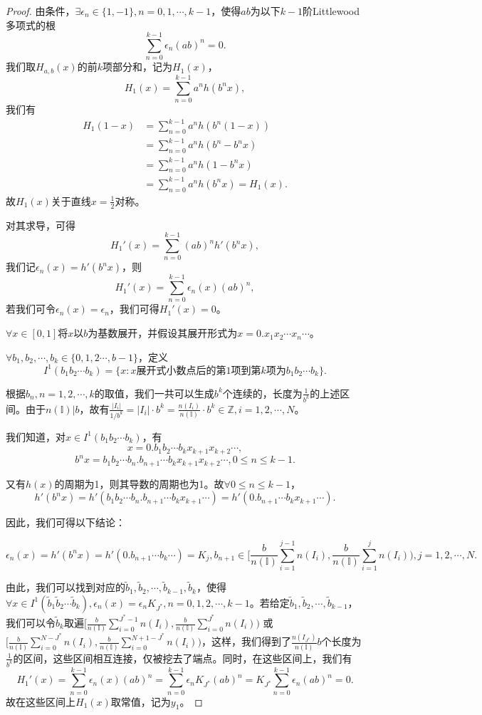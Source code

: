 \begin{proof}
由条件，$\exists \epsilon_n\in\{1,-1\},n=0,1,\cdots,k-1$，使得$ab$为以下$k-1$阶Littlewood多项式的根
$$
      \sum_{n=0}^{k-1}\epsilon_n(ab)^n=0.
$$
我们取$H_{a,b}(x)$的前$k$项部分和，记为$H_1(x)$，
$$
      H_1(x)=\sum_{n=0}^{k-1}a^nh(b^nx),
$$
我们有
$$
    \begin{aligned}
        H_1(1-x)&=\sum_{n=0}^{k-1}a^nh(b^n(1-x))\\
                &=\sum_{n=0}^{k-1}a^nh(b^n-b^nx)\\
                &=\sum_{n=0}^{k-1}a^nh(1-b^nx)\\
                &=\sum_{n=0}^{k-1}a^nh(b^nx)=H_1(x).
    \end{aligned}
$$
故$H_1(x)$关于直线$x=\frac{1}{2}$对称。

对其求导，可得
$$
      H_1'(x)=\sum_{n=0}^{k-1}(ab)^nh'(b^nx),
$$
我们记$\epsilon_n(x)=h'(b^nx)$，则
$$
      H_1'(x)=\sum_{n=0}^{k-1}\epsilon_n(x)(ab)^n,
$$
若我们可令$\epsilon_n(x)=\epsilon_n$，我们可得$H_1'(x)=0$。

$\forall x\in[0,1]$将$x$以$b$为基数展开，并假设其展开形式为$x=0.x_1x_2\cdots x_n\cdots$。

$\forall b_1,b_2,\cdots,b_k\in\{0,1,2\cdots,b-1\}$，定义
$$
      I^1(b_1b_2\cdots b_k)=\{x:x\mbox{展开式小数点后的第}1\mbox{项到第}k\mbox{项为}b_1b_2\cdots b_k\}.
$$

根据$b_n,n=1,2,\cdots,k$的取值，我们一共可以生成$b^k$个连续的，长度为$\frac{1}{b^k}$的上述区间。由于$n(\mathbb{I})|b$，故有$\frac{|I_i|}{1/b^k}=|I_i|\cdot b^k=\frac{n(I_i)}{n(\mathbb{I})}\cdot b^k\in\mathbb{Z},i=1,2,\cdots,N$。

我们知道，对$x\in I^1(b_1b_2\cdots b_k)$，有
$$
      x=0.b_1b_2\cdots b_kx_{k+1}x_{k+2}\cdots,
$$
$$
b^{n}x=b_1b_2\cdots b_{n}.b_{n+1}\cdots b_kx_{k+1}x_{k+2}\cdots,0\le n\le k-1.
$$

又有$h(x)$的周期为1，则其导数的周期也为1。故$\forall0\le n\le k-1$，
$$
      h'(b^nx)=h'(b_1b_2\cdots b_n.b_{n+1}\cdots b_kx_{k+1}\cdots)=h'(0.b_{n+1}\cdots b_kx_{k+1}\cdots).
$$

因此，我们可得以下结论：

$$
      \epsilon_n(x)=h'(b^nx)=h'(0.b_{n+1}\cdots b_k\cdots)=            K_j,b_{n+1}\in{[}\frac{b}{n(\mathbb{I})}\sum_{i=1}^{j-1}n(I_i),\frac{b}{n(\mathbb{I})}\sum_{i=1}^{j}n(I_i){)},j=1,2,\cdots,N.
$$

由此，我们可以找到对应的$\tilde{b}_1,\tilde{b}_2,\cdots,\tilde{b}_{k-1},\tilde{b}_k$，使得$\forall x\in I^1(\tilde{b}_1\tilde{b}_2\cdots \tilde{b}_k),\epsilon_n(x)=\epsilon_nK_{J^*},n=0,1,2,\cdots,k-1$。若给定$\tilde{b}_1,\tilde{b}_2,\cdots,\tilde{b}_{k-1}$，我们可以令$\tilde{b}_k$取遍${[}\frac{b}{n(\mathbb{I})}\sum_{i=0}^{J^*-1}n(I_i),\frac{b}{n(\mathbb{I})}\sum_{i=0}^{J^*}n(I_i){)}$
或${[}\frac{b}{n(\mathbb{I})}\sum_{i=0}^{N-J^*}n(I_i),\frac{b}{n(\mathbb{I})}\sum_{i=0}^{N+1-J^*}n(I_i){)}$，这样，我们得到了$\frac{n(I_{J^*})}{n(\mathbb{I})}b$个长度为$\frac{1}{b^k}$的区间，这些区间相互连接，仅被挖去了端点。同时，在这些区间上，我们有
$$
      H_1'(x)=\sum_{n=0}^{k-1}\epsilon_n(x)(ab)^n=\sum_{n=0}^{k-1}\epsilon_nK_{J^*}(ab)^n=K_{J^*}\sum_{n=0}^{k-1}\epsilon_n(ab)^n=0.
$$
故在这些区间上$H_1(x)$取常值，记为$y_1$。


\end{proof}
